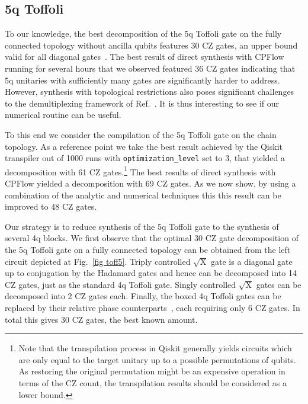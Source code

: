 \documentclass[draft, twocolumn, amsfonts, amssymb, aps, nofootinbib]{revtex4-2}
\newcommand{\CZ}{\textsf{CZ }}
\newcommand{\package}[1]{\textrm {#1 }}
\newcommand{\cpflow}{\package{CPFlow}}
\newcommand{\param}[1]{\texttt{#1}}
\begin{document}
\subsection{5q Toffoli \label{sec toff5}}

To our knowledge, the best decomposition of the 5q Toffoli gate on the fully connected topology without ancilla qubits features $30$ \CZ gates, an upper bound valid for all diagonal gates~\cite{Shende2006}. The best result of direct synthesis with \cpflow running for several hours that we observed featured 36 \CZ gates indicating that 5q unitaries with sufficiently many gates are significantly harder to address. However, synthesis with topological restrictions also poses significant challenges to the demultiplexing framework of Ref.~\cite{Shende2006}. It is thus interesting to see if our numerical routine can be useful.

To this end we consider the compilation of the 5q Toffoli gate on the chain topology. As a reference point we take the best result achieved by the \package{Qiskit} transpiler out of 1000 runs with \param{optimization\_level} set to 3, that yielded a decomposition with 61 \CZ gates.\footnote{Note that the transpilation process in \package{Qiskit} generally yields circuits which are only equal to the target unitary up to a possible permutations of qubits. As restoring the original permutation might be an expensive operation in terms of the \CZ count, the transpilation results should be considered as a lower bound.} The best results of direct synthesis with \cpflow yielded a decomposition with 69 \CZ gates. As we now show, by using a combination of the analytic and numerical techniques this this result can be improved to 48 \CZ gates.

Our strategy is to reduce synthesis of the 5q Toffoli gate to the synthesis of several 4q blocks. We first observe that the optimal 30 \CZ gate decomposition of the 5q Toffoli gate on a fully connected topology can be obtained from the left circuit depicted at Fig.~\ref{fig toff5}. Triply controlled $\sqrt{\text{X}}$ gate is a diagonal gate up to conjugation by the Hadamard gates and hence can be decomposed into 14 \CZ gates, just as the standard 4q Toffoli gate. Singly controlled $\sqrt{\text{X}}$ gates can be decomposed into 2 \CZ gates each. Finally, the boxed 4q Toffoli gates can be replaced by their relative phase counterparts~\cite{Maslov}, each requiring only 6 \CZ gates. In total this gives 30 \CZ gates, the best known amount.
\end{document}
